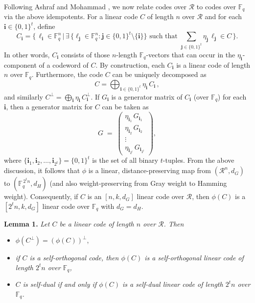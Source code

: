 \documentclass[12pt]{article}
\begin{document}
Following Ashraf and Mohammad \cite{21}, we now relate codes over $\mathcal{R}$ to codes over $\mathbb{F}_q$ via the above idempotents. For a linear code $C$ of length $n$ over $\mathcal{R}$ and for each $\mathbf{i} \in \{0,1\}^t$, define
\[
C_{\mathbf{i}} = \Big\{\, \ell_{\mathbf{i}} \in \mathbb{F}_q^n \,\Big|\, \exists \,\{\ell_{\mathbf{j}} \in \mathbb{F}_q^n : \mathbf{j} \in \{0,1\}^t \setminus\{\mathbf{i}\}\} \text{ such that } \sum_{\mathbf{j} \in \{0,1\}^t} \eta_{\mathbf{j}}\, \ell_{\mathbf{j}} \in C \,\Big\}.
\] 
In other words, $C_{\mathbf{i}}$ consists of those $n$-length $\mathbb{F}_q$-vectors that can occur in the $\eta_{\mathbf{i}}$-component of a codeword of $C$. By construction, each $C_{\mathbf{i}}$ is a linear code of length $n$ over $\mathbb{F}_q$. Furthermore, the code $C$ can be uniquely decomposed as 
\[
C = \bigoplus_{\mathbf{i} \in \{0,1\}^t} \eta_{\mathbf{i}}\, C_{\mathbf{i}}\,,
\] 
and similarly $C^\perp = \bigoplus_{\mathbf{i}} \eta_{\mathbf{i}}\, C_{\mathbf{i}}^\perp$. If $G_{\mathbf{i}}$ is a generator matrix of $C_{\mathbf{i}}$ (over $\mathbb{F}_q$) for each $\mathbf{i}$, then a generator matrix for $C$ can be taken as 
\[
G \;=\; \begin{pmatrix}
\eta_{\mathbf{i}_1}\, G_{\mathbf{i}_1} \\ 
\eta_{\mathbf{i}_2}\, G_{\mathbf{i}_2} \\ 
\vdots \\ 
\eta_{\mathbf{i}_{2^t}}\, G_{\mathbf{i}_{2^t}}
\end{pmatrix},
\] 
where $\{\mathbf{i}_1, \mathbf{i}_2, \ldots, \mathbf{i}_{2^t}\} = \{0,1\}^t$ is the set of all binary $t$-tuples. From the above discussion, it follows that $\phi$ is a linear, distance-preserving map from $(\mathcal{R}^n, d_G)$ to $(\mathbb{F}_q^{\,2^t n}, d_H)$ (and also weight-preserving from Gray weight to Hamming weight). Consequently, if $C$ is an $[n, k, d_G]$ linear code over $\mathcal{R}$, then $\phi(C)$ is a $[2^t n, k, d_G]$ linear code over $\mathbb{F}_q$ with $d_G = d_H$.

\textbf{Lemma 1.} \textit{Let $C$ be a linear code of length $n$ over $\mathcal{R}$. Then}
\begin{itemize}
    \item[(a)] $\phi(C^\perp) = (\phi(C))^\perp$,
    \item[(b)] \textit{if $C$ is a self-orthogonal code, then $\phi(C)$ is a self-orthogonal linear code of length $2^t n$ over $\mathbb{F}_q$,}
    \item[(c)] \textit{$C$ is self-dual if and only if $\phi(C)$ is a self-dual linear code of length $2^t n$ over $\mathbb{F}_q$.}
\end{itemize}
\end{document}
